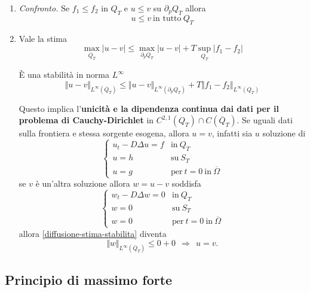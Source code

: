 \documentclass[10pt,a4paper,twoside,openright]{book}
\begin{document}
\begin{enumerate}
\item \textit{Confronto.} Se $f_{1} \leqslant f_{2}$ in $Q_{T}$ e $u\leqslant v$ su $\partial _{p} Q_{T}$ allora
\begin{equation*}
u\leqslant v\ \text{in tutto} \ Q_{T}
\end{equation*}
\item Vale la stima
\begin{equation*}
\max_{\overline{Q}_{T}}| u-v| \leqslant \max_{\partial _{p} Q_{T}}| u-v| +T\sup _{Q_{T}}| f_{1} -f_{2}| 
\end{equation*}

È una stabilità in norma $L^{\infty }$
\begin{equation*}
\Vert u-v\Vert _{L^{\infty }(\overline{Q}_{T})} \leqslant \Vert u-v\Vert _{L^{\infty }(\partial _{p} Q_{T})} +T\Vert f_{1} -f_{2}\Vert _{L^{\infty }(Q_{T})}
\label{diffusione-stima-stabilita}
\end{equation*}

Questo implica l'\textbf{unicità e la dipendenza continua dai dati per il problema di Cauchy-Dirichlet} in $C^{2,1}(Q_{T}) \cap C(\overline{Q}_{T})$. Se uguali dati sulla frontiera e stessa sorgente esogena, allora $u=v$, infatti sia $u$ soluzione di
\begin{equation*}
\begin{cases}
u_{t} -D\Delta u=f & \text{in} \ Q_{T}\\
u=h & \text{su} \ S_{T}\\
u=g & \text{per} \ t=0\ \text{in} \ \overline{\Omega }
\end{cases}
\end{equation*}se $v$ è un'altra soluzione allora $w=u-v$ soddisfa
\begin{equation*}
\begin{cases}
w_{t} -D\Delta w=0 & \text{in} \ Q_{T}\\
w=0 & \text{su} \ S_{T}\\
w=0 & \text{per} \ t=0\ \text{in} \ \overline{\Omega }
\end{cases}
\end{equation*}
allora \eqref{diffusione-stima-stabilita} diventa
\begin{equation*}
\Vert w\Vert _{L^{\infty }(\overline{Q}_{T})} \leqslant 0+0\ \ \Rightarrow \ \ u=v.
\end{equation*}
\end{enumerate}
\subsection{Principio di massimo forte}
\end{document}
